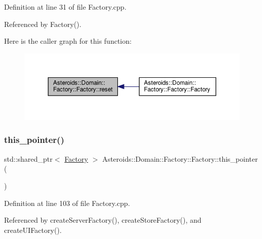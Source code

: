 Definition at line 31 of file Factory.\+cpp.



Referenced by Factory().

Here is the caller graph for this function\+:\nopagebreak
\begin{figure}[H]
\begin{center}
\leavevmode
\includegraphics[width=350pt]{classAsteroids_1_1Domain_1_1Factory_1_1Factory_adf3c63ebcd2022de789631e861f2aa15_icgraph}
\end{center}
\end{figure}
\mbox{\label{classAsteroids_1_1Domain_1_1Factory_1_1Factory_a9fcc5e21b7009846e744564a60b45619}} 
\subsubsection{\texorpdfstring{this\+\_\+pointer()}{this\_pointer()}}
{\footnotesize\ttfamily std\+::shared\+\_\+ptr$<$ \hyperlink{classAsteroids_1_1Domain_1_1Factory_1_1Factory}{Factory} $>$ Asteroids\+::\+Domain\+::\+Factory\+::\+Factory\+::this\+\_\+pointer (\begin{DoxyParamCaption}{ }\end{DoxyParamCaption})\hspace{0.3cm}{\ttfamily [private]}}



Definition at line 103 of file Factory.\+cpp.



Referenced by create\+Server\+Factory(), create\+Store\+Factory(), and create\+U\+I\+Factory().

